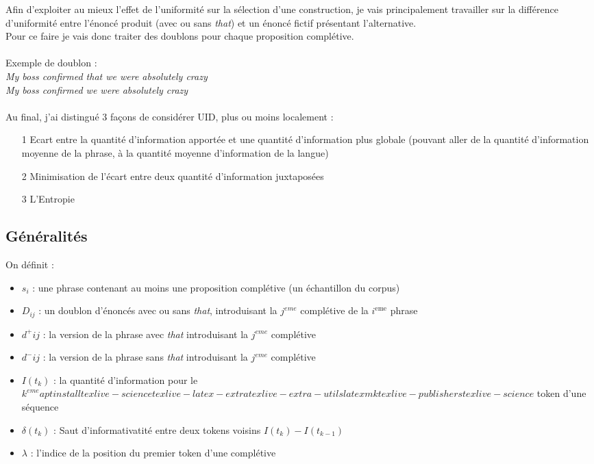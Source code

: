 \documentclass{article}
\begin{document}
Afin d'exploiter au mieux l'effet de l'uniformité sur la sélection d'une construction, je vais principalement travailler sur la différence d'uniformité entre l'énoncé produit (avec ou sans \textit{that}) et un énoncé fictif présentant l'alternative. \\
Pour ce faire je vais donc traiter des doublons pour chaque proposition complétive. \\
\\
Exemple de doublon : \\
\textit{My boss confirmed that we were absolutely crazy}\\
\textit{My boss confirmed we were absolutely crazy}\\
\\

Au final, j'ai distingué 3 façons de considérer UID, plus ou moins localement : \\
\begin{itemize}
  \item[1] Ecart entre la quantité d'information apportée et une quantité d'information plus globale (pouvant aller de la quantité d'information moyenne de la phrase, à la quantité moyenne d'information de la langue)
  \item[2] Minimisation de l'écart entre deux quantité d'information juxtaposées
  \item[3] L'Entropie

\end{itemize}

\subsection{Généralités}
On définit :
\begin{itemize}
\item $s_i$ : une phrase contenant au moins une proposition complétive (un échantillon du corpus)
\item $D_{ij}$ : un doublon d'énoncés avec ou sans \textit{that}, introduisant la $j^{eme}$ complétive de la $i^{\text{eme}}$ phrase
\item $d^+{ij}$ : la version de la phrase avec \textit{that} introduisant la $j^{eme}$ complétive
\item $d^-{ij}$ : la version de la phrase sans \textit{that} introduisant la $j^{eme}$ complétive
\item $I(t_k)$ : la quantité d'information pour le $k^{eme}apt install texlive-science texlive-latex-extra texlive-extra-utils latexmk texlive-publishers texlive-science
$ token d'une séquence
\item $\delta(t_k)$ : Saut d'informativatité entre deux tokens voisins $I(t_k) - I(t_{k-1})$
\item $\lambda$ : l'indice de la position du premier token d'une complétive
\end{itemize}
\end{document}

